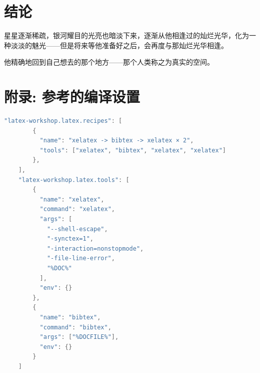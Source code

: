 \documentclass[12]{ctexart}
\begin{document}
\section{结论}

星星逐渐稀疏，银河耀目的光亮也暗淡下来，逐渐从他相逢过的灿烂光华，化为一种淡淡的魅光——但是将来等他准备好之后，会再度与那灿烂光华相逢。

他精确地回到自己想去的那个地方——那个人类称之为真实的空间。


\newpage

\appendix

\section{附录: 参考的编译设置}\label{appendix_a}

\begin{lstlisting}[language=Go, caption={适用于 VS Code + LaTeX Workshop 的编译设置}, label={lst_vscode}]
    "latex-workshop.latex.recipes": [
        {
          "name": "xelatex -> bibtex -> xelatex × 2",
          "tools": ["xelatex", "bibtex", "xelatex", "xelatex"]
        },
    ],
    "latex-workshop.latex.tools": [
        {
          "name": "xelatex",
          "command": "xelatex",
          "args": [
            "--shell-escape", 
            "-synctex=1", 
            "-interaction=nonstopmode", 
            "-file-line-error", 
            "%DOC%"
          ],
          "env": {}
        },
        {
          "name": "bibtex",
          "command": "bibtex",
          "args": ["%DOCFILE%"],
          "env": {}
        }
    ]
\end{lstlisting}


\newpage


\end{document}
